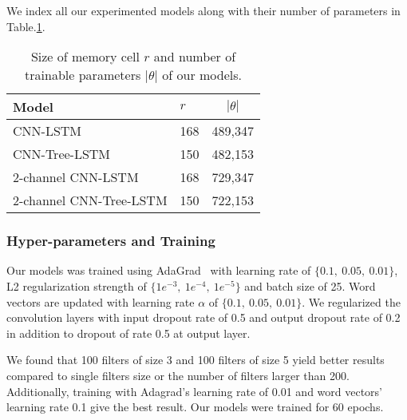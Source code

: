 We index all our experimented models along with their number of parameters in Table.\ref{table:paramtable}.
\begin{table}[H]
	\centering
	\caption{Size of memory cell \(r\) and number of trainable parameters \(\left\vert{\theta}\right\vert\) of our models.
	}
	\label{table:paramtable}
	\begin{tabular}{|l|l|l|}
		\hline
		Model & \(r\) & \multicolumn{1}{|c|}{\(\left\vert{\theta}\right\vert\)}\\ \hline
		CNN-LSTM                 & 168         & 489,347          \\
		CNN-Tree-LSTM            & 150         & 482,153          \\
		2-channel CNN-LSTM       & 168         & 729,347          \\
		2-channel CNN-Tree-LSTM  & 150         &
		722,153 \\
		\hline
	\end{tabular}
\end{table}
\subsubsection{Hyper-parameters and Training}
Our models was trained using AdaGrad~\cite{duchi2011adaptive} with learning rate of $\{0.1,~ 0.05,~ 0.01\}$, L2 regularization strength of $\{1e^{-3},~ 1e^{-4}, ~ 1e^{-5} \}$ and batch size of 25.
Word vectors are updated with learning rate $\alpha$ of $\{0.1,~0.05, ~0.01\}$.
We regularized the convolution layers with input dropout rate of 0.5 and output dropout rate of 0.2 in addition to dropout of rate 0.5 at output layer.

We found that 100 filters of size 3 and 100 filters of size 5 yield better results compared to single filters size or the number of filters larger than 200.
Additionally, training with Adagrad's learning rate of 0.01 and word vectors' learning rate 0.1 give the best result.
Our models were trained for 60 epochs.
